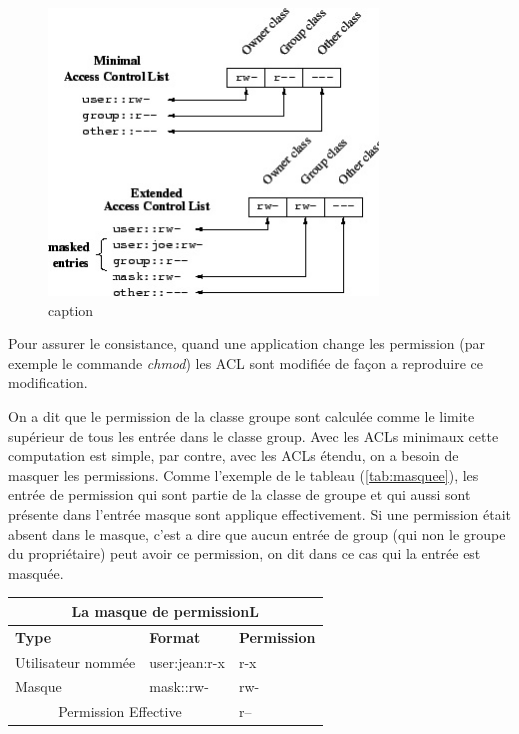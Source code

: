 \begin{figure}[htbp]
	\centering
		\includegraphics[height=3in]{img/acl-mapping.jpg}
	\caption{caption}
	\label{fig:img_acl-mapping}
\end{figure}


Pour assurer le consistance, quand une application change les permission (par exemple le commande \emph{chmod}) les ACL sont modifiée de façon a reproduire ce modification. 

On a dit que le permission de la classe groupe sont calculée comme le limite supérieur de tous les entrée dans le classe group. Avec les ACLs minimaux cette computation est simple, par contre, avec les ACLs étendu, on a besoin de masquer les permissions. Comme l'exemple de le tableau (\ref{tab:masquee}), les entrée de permission qui sont partie de la classe de groupe et qui aussi sont présente dans l'entrée masque sont applique effectivement. Si une permission était absent dans le masque, c'est a dire que aucun entrée de group (qui non le groupe du propriétaire) peut avoir ce permission, on dit dans ce cas qui la entrée est masquée.  

\begin{center}
\begin{tabular}{|l|l|l|}
  \hline
    \multicolumn{3}{|c|}{La masque de permissionL} \\
  \hline
	\textbf{Type} & \textbf{Format} & \textbf{Permission} \\
  \hline
	Utilisateur nommée & user:jean:r-x  & r-x\\
  \hline
	Masque & mask::rw- & rw-\\
  \hline
	\multicolumn{2}{|c|}{Permission Effective} & r--\\
  \hline
\end{tabular}
\label{tab:masque}
\end{center}

